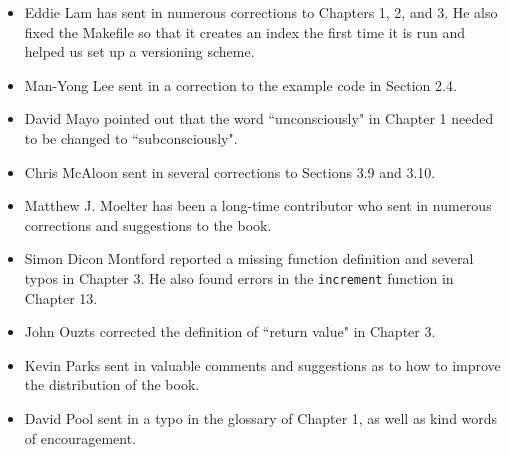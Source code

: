 \begin{itemize}

\item Eddie Lam has sent in numerous corrections to Chapters 
1, 2, and 3.
He also fixed the Makefile so that it creates an index the first time it is
run and helped us set up a versioning scheme.  


\item Man-Yong Lee sent in a correction to the example code in
Section 2.4.  


\item David Mayo pointed out that the word ``unconsciously"
in Chapter 1 needed
to be changed to ``subconsciously".


\item Chris McAloon sent in several corrections to Sections 3.9 and
3.10.


\item Matthew J. Moelter has been a long-time contributor who sent
in numerous corrections and suggestions to the book.  


\item Simon Dicon Montford reported a missing function definition and
several typos in Chapter 3.  He also found errors in the {\tt increment}
function in Chapter 13.


\item John Ouzts corrected the definition of ``return value"
in Chapter 3.


\item Kevin Parks sent in valuable comments and suggestions as to how
to improve the distribution of the book.


\item David Pool sent in a typo in the glossary of Chapter 1, as well
as kind words of encouragement.


\end{itemize}
